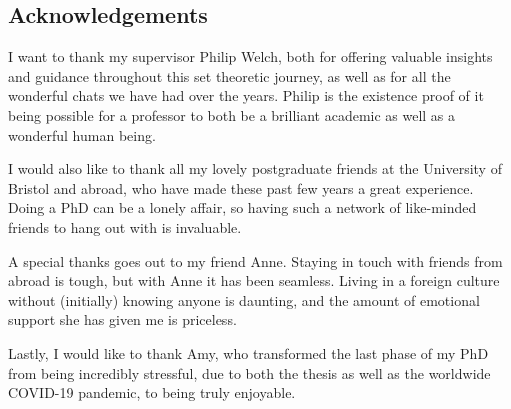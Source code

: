 \documentclass[../main]{subfiles}
\begin{document}
\newpage
\thispagestyle{fancy}
\setlength{\parindent}{10pt}

\begin{onehalfspacing}

  \vspace*{75pt}

  \section*{\huge Acknowledgements}
  I want to thank my supervisor Philip Welch, both for offering valuable insights and guidance throughout this set theoretic journey, as well as for all the wonderful chats we have had over the years. Philip is the existence proof of it being possible for a professor to both be a brilliant academic as well as a wonderful human being.

  I would also like to thank all my lovely postgraduate friends at the University of Bristol and abroad, who have made these past few years a great experience. Doing a PhD can be a lonely affair, so having such a network of like-minded friends to hang out with is invaluable.

  A special thanks goes out to my friend Anne. Staying in touch with friends from abroad is tough, but with Anne it has been seamless. Living in a foreign culture without (initially) knowing anyone is daunting, and the amount of emotional support she has given me is priceless.

  Lastly, I would like to thank Amy, who transformed the last phase of my PhD from being incredibly stressful, due to both the thesis as well as the worldwide COVID-19 pandemic, to being truly enjoyable.

\end{onehalfspacing}
\end{document}
